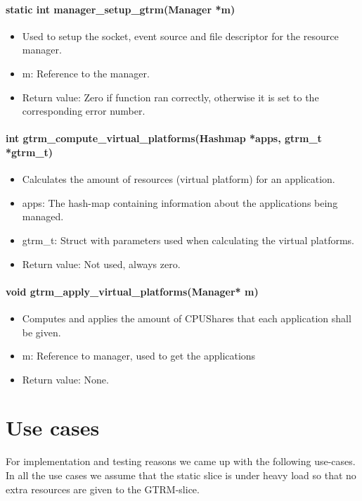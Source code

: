 \documentclass[nobiblatex]{LTHthesis}
\begin{document}
\subsubsection{static int manager\_setup\_gtrm(Manager *m)}
\begin{itemize}
\item Used to setup the socket, event source and file descriptor for the resource manager.
\item m: Reference to the manager.
\item Return value: Zero if function ran correctly, otherwise it is set to the corresponding error number.
\end{itemize}

\subsubsection{int gtrm\_compute\_virtual\_platforms(Hashmap *apps, gtrm\_t *gtrm\_t)}
\begin{itemize}
\item Calculates the amount of resources (virtual platform) for an application.
\item apps: The hash-map containing information about the applications being managed.
\item gtrm\_t: Struct with parameters used when calculating the virtual platforms.
\item Return value: Not used, always zero.
\end{itemize}

\subsubsection{void gtrm\_apply\_virtual\_platforms(Manager* m)}
\begin{itemize}
\item Computes and applies the amount of CPUShares that each application shall be given.
\item m: Reference to manager, used to get the applications
\item Return value: None.
\end{itemize}

\chapter{Use cases}
For implementation and testing reasons we came up with the following use-cases. In all the use cases we assume that the static slice is under heavy load so that no extra resources are given to the GTRM-slice. 
\end{document}
